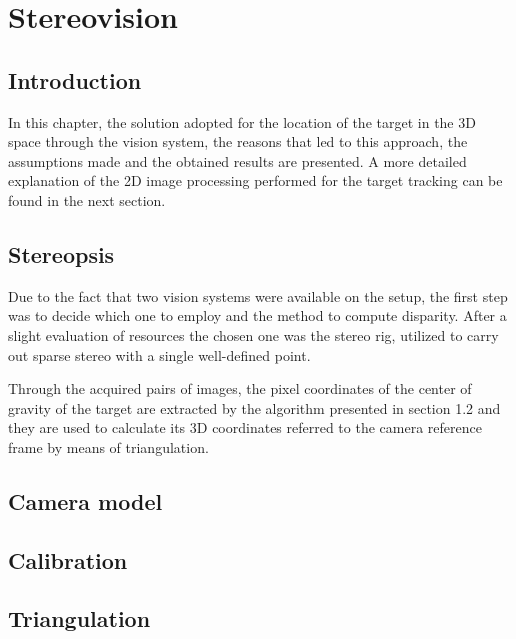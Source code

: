 
\chapter{Stereovision} %
\label{sec:stereopsis}

\section{Introduction}
In this chapter, the solution adopted for the location of the target in the 3D space through the vision system, the reasons that led to this approach, the assumptions made and the obtained results are presented. A more detailed explanation of the 2D image processing performed for the target tracking can be found in the next section.

\section{Stereopsis}
Due to the fact that two vision systems were available on the setup, the first step was to decide which one to employ and the method to compute disparity. After a slight evaluation of resources the chosen one was the stereo rig, utilized to carry out sparse stereo with a single well-defined point. 

Through the acquired pairs of images, the pixel coordinates of the center of gravity of the target are extracted by the algorithm presented in section 1.2 and they are used to calculate its 3D coordinates referred to the camera reference frame by means of triangulation.

\section{Camera model}


\section{Calibration}

\section{Triangulation}


